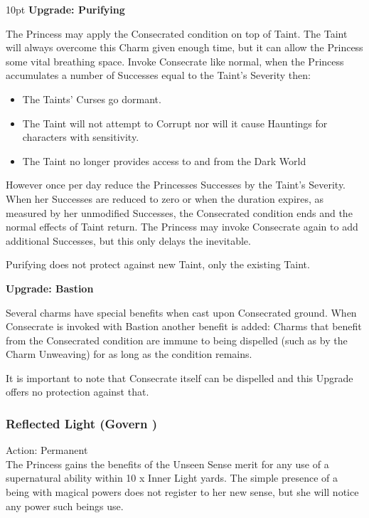 \begin{myindentpar}{10pt} \textbf{Upgrade: Purifying}

The Princess may apply the Consecrated condition on top of Taint. The Taint will always overcome this Charm given enough time, but it can allow the Princess some vital breathing space. Invoke Consecrate like normal, when the Princess accumulates a number of Successes equal to the Taint's Severity then:

   \begin{itemize} \item The Taints' Curses go dormant.
    \item The Taint will not attempt to Corrupt nor will it cause Hauntings for characters with sensitivity.
    \item The Taint no longer provides access to and from the Dark World\end{itemize}

However once per day reduce the Princesses Successes by the Taint's Severity. When her Successes are reduced to zero or when the duration expires, as measured by her unmodified Successes, the Consecrated condition ends and the normal effects of Taint return. The Princess may invoke Consecrate again to add additional Successes, but this only delays the inevitable.

Purifying does not protect against new Taint, only the existing Taint.

\textbf{Upgrade: Bastion}

Several charms have special benefits when cast upon Consecrated ground. When Consecrate is invoked with Bastion another benefit is added: Charms that benefit from the Consecrated condition are immune to being dispelled (such as by the Charm Unweaving) for as long as the condition remains.

It is important to note that Consecrate itself can be dispelled and this Upgrade offers no protection against that.

\end{myindentpar}

\subsubsection*{Reflected Light (Govern \textbullet)}

\noindent Action: Permanent\\ 

\noindent The Princess gains the benefits of the Unseen Sense merit for any use of a supernatural ability within 10 x Inner Light yards. The simple presence of a being with magical powers does not register to her new sense, but she will notice any power such beings use.

